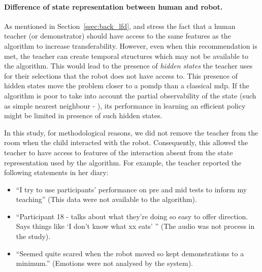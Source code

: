 
\paragraph{Difference of state representation between human and robot.} \label{sec:differences_representation}

As mentioned in Section~\ref{ssec:back_lfd}, \cite{knox2014learning} and \cite{sequeira2016discovering} stress the fact that a human teacher (or demonstrator) should have access to the same features as the algorithm to increase transferability. However, even when this recommendation is met, the teacher can create temporal structures which may not be available to the algorithm. This would lead to the presence of \emph{hidden states} the teacher uses for their selections that the robot does not have access to. This presence of hidden states move the problem closer to a \gls{pomdp} than a classical \gls{mdp}. If the algorithm is poor to take into account the partial observability of the state (such as simple nearest neighbour - \citealt{mccallum1995instance}), its performance in learning an efficient policy might be limited in presence of such hidden states.

In this study, for methodological reasons, we did not remove the teacher from the room when the child interacted with the robot. Consequently, this allowed the teacher to have access to features of the interaction absent from the state representation used by the algorithm. For example, the teacher reported the following statements in her diary: 
\begin{itemize}
	\item ``I try to use participants’ performance on pre and mid tests to inform my teaching'' (This data were not available to the algorithm).
	\item ``Participant 18 - talks about what they’re doing so easy to offer direction. Says things like `I don’t know what xx eats' '' (The audio was not process in the study).
	\item ``Seemed quite scared when the robot moved so kept demonstrations to a minimum.'' (Emotions were not analysed by the system).
\end{itemize}

